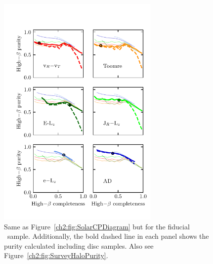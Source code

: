 \begin{figure}
    \centering
    \includegraphics[width=0.7\textwidth]{figure/ch2/SurveyHaloCompletenessPurity.pdf}
    \caption{Same as Figure~\ref{ch2:fig:SolarCPDiagram} but for the fiducial \survey\ sample. Additionally, the bold dashed line in each panel shows the purity calculated including disc samples. Also see Figure~\ref{ch2:fig:SurveyHaloPurity}.}
    \label{ch2:fig:SurveyCPDiagram}
\end{figure}

